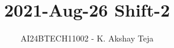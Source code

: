 \documentclass[journal,9pt,onecolumn]{IEEEtran}
\begin{document}

\vspace{3cm}

\title{2021-Aug-26 Shift-2}
\author{AI24BTECH11002 - K. Akshay Teja}
{\let\newpage\relax\maketitle}

\renewcommand{\thefigure}{\theenumi}
\renewcommand{\thetable}{\theenumi}
\setlength{\intextsep}{10pt} %

\renewcommand{\thetable}{\theenumi}
\end{document}
